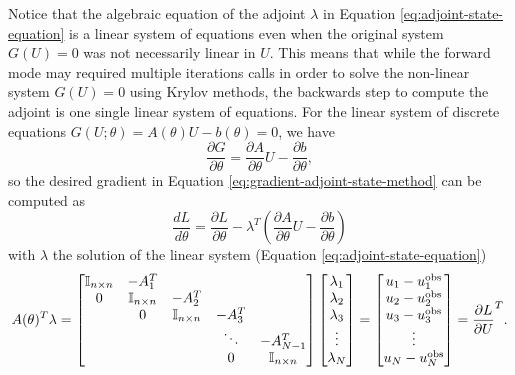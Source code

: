 Notice that the algebraic equation of the adjoint $\lambda$ in Equation \eqref{eq:adjoint-state-equation} is a linear system of equations even when the original system $G(U)=0$ was not necessarily linear in $U$.
This means that while the forward mode may required multiple iterations calls in order to solve the non-linear system $G(U) = 0$ using Krylov methods, the backwards step to compute the adjoint is one single linear system of equations. 
For the linear system of discrete equations $G(U; \theta)=A(\theta) U - b(\theta)=0$, we have \cite{Johnson}
\begin{equation}
    \frac{\partial G}{\partial \theta} 
    = 
    \frac{\partial A }{\partial \theta} U - \frac{\partial b}{\partial \theta},
\end{equation}
so the desired gradient in Equation \eqref{eq:gradient-adjoint-state-method} can be computed as 
\begin{equation}
    \frac{dL}{d\theta} 
    = 
    \frac{\partial L}{\partial \theta} 
    - 
    \lambda^T \left( \frac{\partial A }{\partial \theta} U - \frac{\partial b}{\partial \theta} \right)
    \label{eq:dhdtheta_linear}
\end{equation}
with $\lambda$ the solution of the linear system (Equation \eqref{eq:adjoint-state-equation})
\begin{equation}
    A(\theta)^T \lambda 
    =
    \begin{bmatrix}
        \operatorname{\mathbb{I}}_{n \times n} & -A_1^T &   &  & \\
        0 & \operatorname{\mathbb{I}}_{n \times n} & -A_2^T &  &  \\
          & 0 & \operatorname{\mathbb{I}}_{n \times n} & -A_3^T &  \\
         &  &   & \ddots & -A_{N-1}^T  \\
         &  &  & 0 & \operatorname{\mathbb{I}}_{n \times n}
    \end{bmatrix}
    \begin{bmatrix}
        \lambda_1 \\
        \lambda_2 \\
        \lambda_3 \\
        \vdots \\
        \lambda_N
    \end{bmatrix}
    = 
    \begin{bmatrix}
        u_1 - u_1^\text{obs} \\
        u_2 - u_2^\text{obs} \\
        u_3 - u_3^\text{obs} \\
        \vdots \\
        u_N - u_N^\text{obs}     
    \end{bmatrix}
    = 
    \frac{\partial L}{\partial U}^T.
    \label{eq:linea-adjoint-state-equation}
\end{equation}
